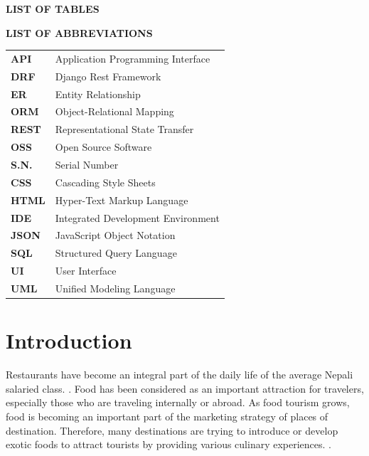 \documentclass[12pt, a4paper, oneside]{article}
\begin{document}
\large
{}
\begin{center}
	\textbf{LIST OF TABLES}
\end{center}
\renewcommand{\listtablename}{}
\normalsize
\listoftables

\break

\large
\begin{center}
	\textbf{LIST OF ABBREVIATIONS}
\end{center}

\renewcommand{\arraystretch}{1.2}
\begin{table}[H]
\begin{tabular}{ll}
\normalsize
\textbf{API}     & Application Programming Interface\\
\textbf{DRF}     & Django Rest Framework\\
\textbf{ER}      & Entity Relationship\\
\textbf{ORM}     & Object-Relational Mapping\\
\textbf{REST}    & Representational State Transfer\\
\textbf{OSS}     & Open Source Software\\
\textbf{S.N.}    & Serial Number\\
\textbf{CSS}	 & Cascading Style Sheets\\
\textbf{HTML}	 & Hyper-Text Markup Language\\
\textbf{IDE}	 & Integrated Development Environment\\
\textbf{JSON}    &JavaScript Object Notation\\
\textbf{SQL}	 & Structured Query Language\\
\textbf{UI}		 & User Interface\\
\textbf{UML}	 & Unified Modeling Language\\
\end{tabular}
\end{table}
\pagebreak

\cfoot{\textbf{\thepage} /  \pageref{LastPage}}
\normalsize
{}




\section{Introduction} 
Restaurants have become an integral part of the daily life of the average Nepali salaried class.  \cite{newbusiness}. Food has been considered as an important attraction for travelers, especially those who are traveling internally or abroad. As food tourism grows, food is becoming an important part of the marketing strategy of places of destination. Therefore, many destinations are trying to introduce or develop exotic foods to attract tourists by providing various culinary experiences.  \cite{lee2020influence}.
\end{document}
